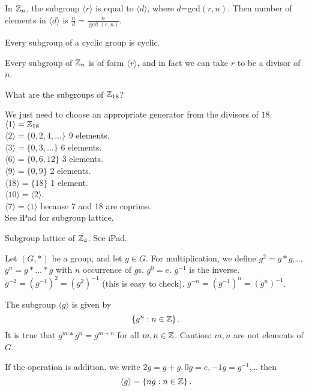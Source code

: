 \documentclass[class=article,crop=false]{standalone}
\begin{document}
\begin{thm}[]
	In $\mathbb{Z}_n$, the subgroup $\langle r \rangle$ is equal to $\langle d \rangle$, where $d$=gcd$(r,n)$. Then number of elements in  $\langle d \rangle$ is $\frac{n}{d}=\frac{n}{ \gcd (r,n) }$.
\end{thm}

\begin{thm}[]
Every subgroup of a cyclic group is cyclic.
\end{thm}

\begin{coro}[]
Every subgroup of $\mathbb{Z}_n$ is of form $\langle r \rangle$, and in fact we can take $r$ to be a divisor of  $n$. 
\end{coro}

\begin{eg}[]
	What are the subgroups of $\mathbb{Z}_{18}$?

	We just need to choose an appropriate generator from the divisors of $18$. 
	$\langle 1 \rangle = \mathbb{Z}_{18}$\\
	$\langle 2 \rangle = \{0,2,4,\ldots\} $ 9 elements.\\
	$\langle 3 \rangle = \{0,3,\ldots\} $ 6 elements.\\
	$\langle 6 \rangle = \{0,6,12\} $ 3 elements.\\
	$\langle 9 \rangle = \{0,9\} $ 2 elements.\\
	$\langle 18 \rangle = \{18\} $ 1 element.\\
	$\langle 10 \rangle=\langle 2 \rangle$.\\
	$\langle 7 \rangle = \langle 1 \rangle$ because 7 and 18 are coprime.\\

	See iPad for subgroup lattice.
\end{eg}

\begin{eg}[]
Subgroup lattice of $\mathbb{Z}_4$. See iPad.
\end{eg}

\begin{notation}
	Let $(G,*)$ be a group, and let  $g \in G$. For multiplication, we define $g^2 = g*g$,\ldots,$g^{n}=g*\ldots*g$ with $n$ occurrence of  $g$s.  $g^{0}=e$. $g^{-1}$ is the inverse. $g^{-2}= \left( g^{-1} \right)^2 = \left( g^2 \right) ^{-1}$ (this is easy to check). $g^{-n} = \left( g^{-1} \right) ^{n} = \left( g^{n} \right) ^{-1}$. 

	The subgroup $\langle g \rangle$ is given by 
	\[
	\left\{ g^{n}: n \in \mathbb{Z} \right\} 
	.\] 
It is true that $g^{m}*g^{n}=g^{m+n}$ for all $m,n \in \mathbb{Z}$. Caution: $m,n$ are not elements of  $G$.

If the operation is addition. we write $2g = g+g, 0g=e, -1g=g^{-1}$,\ldots
then 
\[
\langle g \rangle = \left\{ ng:n \in \mathbb{Z} \right\} 
.\] 

\end{notation}
\end{document}

